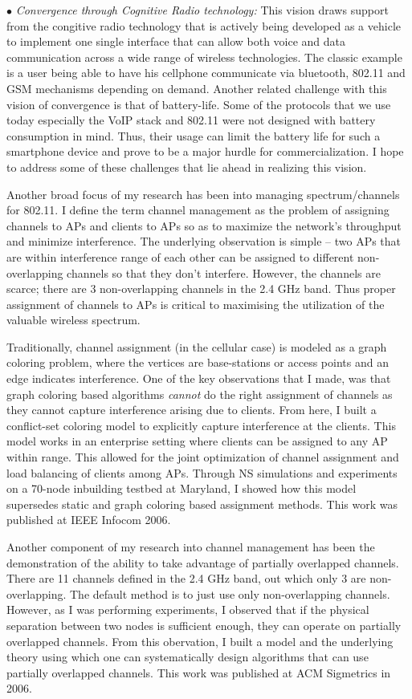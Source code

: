 \documentclass[10pt,letterpaper]{article}
\begin{document}
$\bullet$ {\it Convergence through Cognitive Radio technology:} This vision draws support from the congitive radio
technology that is actively being developed as a vehicle to implement one single interface that can allow both voice and
data communication across a wide range of wireless technologies. The classic example is a user being able to have his
cellphone communicate via bluetooth, 802.11 and GSM mechanisms depending on demand. Another related challenge with this
vision of convergence is that of battery-life. Some of the protocols that we use today especially the VoIP stack and
802.11 were not designed with battery consumption in mind. Thus, their usage can limit the battery life for such a
smartphone device and prove to be a major hurdle for commercialization. I hope to address some of these challenges that lie
ahead in realizing this vision.

\iffalse
Another broad focus of my research  has been into managing spectrum/channels for 802.11. I define the term channel management
as the problem of assigning channels to APs and clients to APs so as to maximize the network's throughput and minimize
interference. The underlying observation is simple -- two APs that are within interference range of each other can be
assigned to different non-overlapping channels so that they don't interfere. However, the channels are scarce; there are
3 non-overlapping channels in the 2.4 GHz band. Thus proper assignment of channels to APs is critical to maximising the
utilization of the valuable wireless spectrum. 

Traditionally, channel assignment (in the cellular case) is modeled as a graph coloring problem, where the vertices are
base-stations or access points and an edge indicates interference. One of the key observations that I made, was that
graph coloring based algorithms {\it cannot} do the right assignment of channels as they cannot capture interference
arising due to clients. From here, I built a conflict-set coloring model to explicitly capture interference at the
clients. This model works in an enterprise setting where clients can be assigned to any AP within range. This allowed
for the joint optimization of channel assignment and load balancing of clients among APs. Through NS simulations and
experiments on a 70-node inbuilding testbed at Maryland, I showed how this model supersedes static and graph coloring
based assignment methods. This work was published at IEEE Infocom 2006. 

Another component of my research into channel management has been the demonstration of the ability to take
advantage of partially overlapped channels. There are 11 channels defined in the 2.4 GHz band, out which only
3 are non-overlapping. The default method is to just use only non-overlapping channels. However, as I was performing
experiments, I observed that if the physical separation between two nodes is sufficient enough, they can operate on
partially overlapped channels. From this obervation, I built a model and the underlying theory using which one
can systematically design algorithms that can use partially overlapped channels. This work was published at 
ACM Sigmetrics in 2006.  
 
\end{document}
